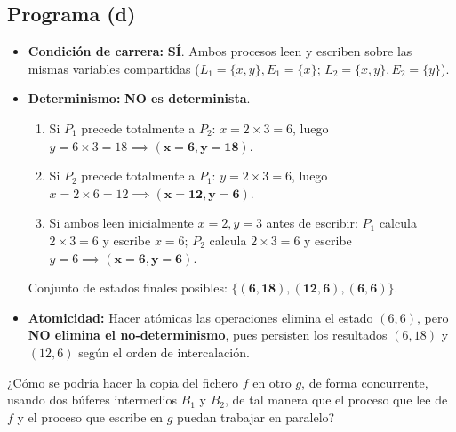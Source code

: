 \begin{solucion}
\subsection*{Programa (d)}
\begin{itemize}[leftmargin=*]
    \item \textbf{Condición de carrera:} \textbf{SÍ}. Ambos procesos leen y escriben sobre las mismas variables compartidas ($L_1 = \{x, y\}, E_1 = \{x\}$; $L_2 = \{x, y\}, E_2 = \{y\}$).
    \item \textbf{Determinismo:} \textbf{NO es determinista}.
    \begin{enumerate}
        \item Si $P_1$ precede totalmente a $P_2$: $x = 2 \times 3 = 6$, luego $y = 6 \times 3 = 18 \implies \mathbf{(x=6, y=18)}$.
        \item Si $P_2$ precede totalmente a $P_1$: $y = 2 \times 3 = 6$, luego $x = 2 \times 6 = 12 \implies \mathbf{(x=12, y=6)}$.
        \item Si ambos leen inicialmente $x=2, y=3$ antes de escribir: $P_1$ calcula $2 \times 3 = 6$ y escribe $x=6$; $P_2$ calcula $2 \times 3 = 6$ y escribe $y=6 \implies \mathbf{(x=6, y=6)}$.
    \end{enumerate}
    Conjunto de estados finales posibles: $\mathbf{\{(6, 18), (12, 6), (6, 6)\}}$.
    \item \textbf{Atomicidad:} Hacer atómicas las operaciones elimina el estado $(6, 6)$, pero \textbf{NO elimina el no-determinismo}, pues persisten los resultados $(6, 18)$ y $(12, 6)$ según el orden de intercalación.
\end{itemize}
\end{solucion}

\begin{ejercicio}
¿Cómo se podría hacer la copia del fichero $f$ en otro $g$, de forma concurrente, usando dos búferes intermedios $B_1$ y $B_2$, de tal manera que el proceso que lee de $f$ y el proceso que escribe en $g$ puedan trabajar en paralelo?
\end{ejercicio}

